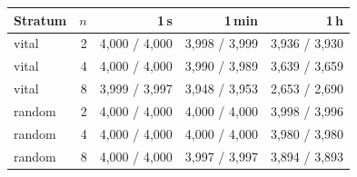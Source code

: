 \begin{tabular}{@{}lrrrr@{}}
\toprule
Stratum & $n$ & 1\,s & 1\,min & 1\,h \\
\midrule
vital & 2 & 4,000 / 4,000 & 3,998 / 3,999 & 3,936 / 3,930 \\
vital & 4 & 4,000 / 4,000 & 3,990 / 3,989 & 3,639 / 3,659 \\
vital & 8 & 3,999 / 3,997 & 3,948 / 3,953 & 2,653 / 2,690 \\
random & 2 & 4,000 / 4,000 & 4,000 / 4,000 & 3,998 / 3,996 \\
random & 4 & 4,000 / 4,000 & 4,000 / 4,000 & 3,980 / 3,980 \\
random & 8 & 4,000 / 4,000 & 3,997 / 3,997 & 3,894 / 3,893 \\
\bottomrule
\end{tabular}
